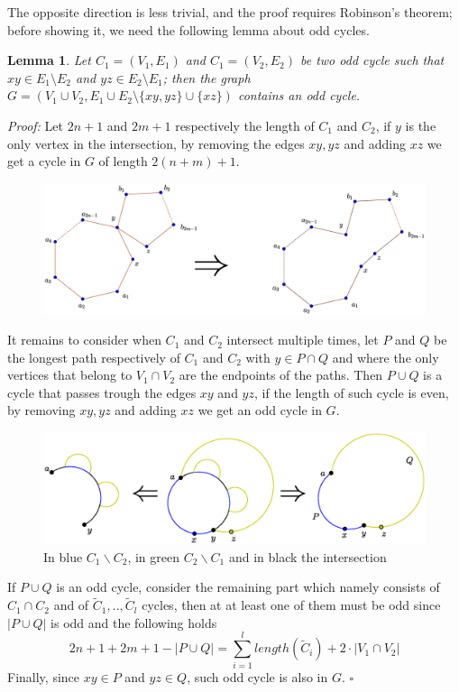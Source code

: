 \documentclass[a4paper,12pt,oneside]{book}
\newtheorem{lemma}[theorem]{Lemma}
\newcommand*{\QED}{\hfill\ensuremath{\square}}
\begin{document}
The opposite direction is less trivial, and the proof requires  Robinson's theorem; before showing it, we need the following lemma about odd cycles.

\begin{lemma}\label{tech-lemma-graph}
Let $C_1=(V_1,E_1)$ and $C_1=(V_2,E_2)$ be two odd cycle such that $xy\in E_1\setminus E_2$ and 
$yz\in E_2\setminus E_1$;  then the graph $G=(V_1\cup V_2, E_1\cup E_2\setminus\{xy,yz\}\cup\{xz\})$ contains an odd cycle.
\end{lemma}
\textit{Proof:} 
Let $2n+1$ and $2m+1$ respectively the length of $C_1$ and $C_2$, if $y$ is the only vertex in the intersection,	 by removing the edges $xy,yz$ and adding $xz$ we get a cycle in $G$ of length $2(n+m)+1$. 
\begin{figure}[h]
\includegraphics[scale=0.23]{oddcycles1.eps}
\end{figure}

\newpage
It remains to consider when $C_1$ and $C_2$ intersect multiple times, let $P$ and $Q$ be the longest path respectively of $C_1$ and $C_2$ with $y\in P\cap Q$ and where the only vertices that belong to $V_1\cap V_2$ are the endpoints of the paths.
Then $P\cup Q$ is a cycle that passes trough the edges $xy$ and $yz$, if the length of such cycle is even, by removing $xy,yz$ and adding $xz$ we get an odd cycle in $G$.

\begin{figure}[h]
\centering
\includegraphics[scale=0.5]{oddcycles-interceptions.eps}
\caption{In blue $C_1 \backslash C_2 $, in green $C_2\backslash C_1 $ and in black the intersection }
\end{figure}
If $P\cup Q$ is an odd cycle, consider the remaining part which namely consists of $C_1\cap C_2$ and of $\tilde{C}_1,..,\tilde{C}_l$ cycles, then at at least one of them must be odd since $|P\cup Q|$ is odd and the following holds $$2n+1+2m+1-|P\cup Q| = \sum^l_{i=1} length(\tilde{C}_i) + 2\cdot |V_1\cap V_2|   $$
Finally, since $xy\in P$ and $yz\in Q$, such odd cycle is also in $G$. 
\QED
\end{document}
